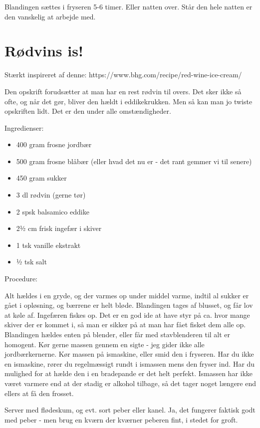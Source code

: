 \documentclass[
  letterpaper,
  DIV=11,
  numbers=noendperiod]{scrreprt}
\providecommand{\tightlist}{%
  \setlength{\itemsep}{0pt}\setlength{\parskip}{0pt}}\usepackage{longtable,booktabs,array}
\begin{document}
Blandingen sættes i fryseren 5-6 timer. Eller natten over. Står den hele
natten er den vanskelig at arbejde med.

\hypertarget{ruxf8dvins-is}{%
\section{Rødvins is!}\label{ruxf8dvins-is}}

Stærkt inspireret af denne:
https://www.bhg.com/recipe/red-wine-ice-cream/

Den opskrift forudsætter at man har en rest rødvin til overs. Det sker
ikke så ofte, og når det gør, bliver den hældt i eddikekrukken. Men så
kan man jo twiste opskriften lidt. Det er den under alle omstændigheder.

Ingredienser:

\begin{itemize}
\tightlist
\item
  400 gram frosne jordbær
\item
  500 gram frosne blåbær (eller hvad det nu er - det rant gemmer vi til
  senere)
\item
  450 gram sukker
\item
  3 dl rødvin (gerne tør)
\item
  2 spsk balsamico eddike
\item
  2½ cm frisk ingefær i skiver
\item
  1 tsk vanille ekstrakt
\item
  ½ tsk salt
\end{itemize}

Procedure:

Alt hældes i en gryde, og der varmes op under middel varme, indtil al
sukker er gået i opløsning, og bærrene er helt bløde. Blandingen tages
af blusset, og får lov at køle af. Ingefæren fiskes op. Det er en god
ide at have styr på ca. hvor mange skiver der er kommet i, så man er
sikker på at man har fået fisket dem alle op. Blandingen hældes enten på
blender, eller får med stavblenderen til alt er homogent. Kør gerne
massen gennem en sigte - jeg gider ikke alle jordbærkernerne. Kør massen
på ismaskine, eller smid den i fryseren. Har du ikke en ismaskine, rører
du regelmæssigt rundt i ismassen mens den fryser ind. Har du mulighed
for at hælde den i en bradepande er det helt perfekt. Ismassen har ikke
været varmere end at der stadig er alkohol tilbage, så det tager noget
længere end ellers at få den frosset.

Server med flødeskum, og evt. sort peber eller kanel. Ja, det fungerer
faktisk godt med peber - men brug en kværn der kværner peberen fint, i
stedet for groft.
\end{document}
